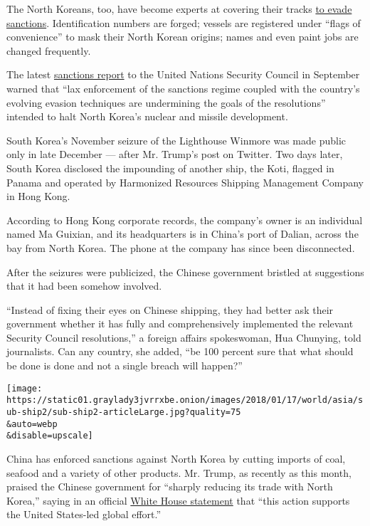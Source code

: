 The North Koreans, too, have become experts at covering their tracks
\href{https://www.nytimes3xbfgragh.onion/2017/05/12/world/asia/north-korea-sanctions-loopholes-china-united-states-garment-industry.html}{to
evade sanctions}. Identification numbers are forged; vessels are
registered under ``flags of convenience'' to mask their North Korean
origins; names and even paint jobs are changed frequently.

The latest
\href{http://www.un.org/ga/search/view_doc.asp?symbol=S/2017/742}{sanctions
report} to the United Nations Security Council in September warned that
``lax enforcement of the sanctions regime coupled with the country's
evolving evasion techniques are undermining the goals of the
resolutions'' intended to halt North Korea's nuclear and missile
development.

South Korea's November seizure of the Lighthouse Winmore was made public
only in late December --- after Mr. Trump's post on Twitter. Two days
later, South Korea disclosed the impounding of another ship, the Koti,
flagged in Panama and operated by Harmonized Resources Shipping
Management Company in Hong Kong.

According to Hong Kong corporate records, the company's owner is an
individual named Ma Guixian, and its headquarters is in China's port of
Dalian, across the bay from North Korea. The phone at the company has
since been disconnected.

After the seizures were publicized, the Chinese government bristled at
suggestions that it had been somehow involved.

``Instead of fixing their eyes on Chinese shipping, they had better ask
their government whether it has fully and comprehensively implemented
the relevant Security Council resolutions,'' a foreign affairs
spokeswoman, Hua Chunying, told journalists. Can any country, she added,
``be 100 percent sure that what should be done is done and not a single
breach will happen?''

\texttt{[image: https://static01.graylady3jvrrxbe.onion/images/2018/01/17/world/asia/sub-ship2/sub-ship2-articleLarge.jpg?quality=75\\\&auto=webp\\\&disable=upscale]}

China has enforced sanctions against North Korea by cutting imports of
coal, seafood and a variety of other products. Mr. Trump, as recently as
this month, praised the Chinese government for ``sharply reducing its
trade with North Korea,'' saying in an official
\href{https://www.whitehouse.gov/briefings-statements/statement-press-secretary-19/}{White
House statement} that ``this action supports the United States-led
global effort.''

